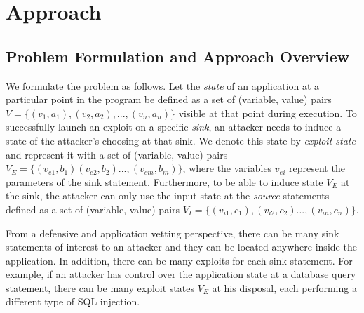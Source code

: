 \section{Approach}
\label{sec:approach}

\subsection{Problem Formulation and Approach Overview} We formulate the problem as follows. Let the \textit{state} of an application at a particular point in the program be defined as a set of (variable, value) pairs $V = \{(v_1, a_1), (v_2, a_2), ..., (v_n, a_n)\}$ visible at that point during execution. 
To successfully launch an exploit on a specific \textit{sink}, an attacker needs to induce a state of the attacker's choosing at that sink. We denote this state by \textit{exploit state} and represent it with a set of (variable, value) pairs $V_E = \{(v_{e1}, b_1) (v_{e2}, b_2) ..., (v_{em}, b_m)\}$, where the variables $v_{ei}$ represent the parameters of the sink statement. Furthermore, to be able to induce state $V_E$ at the sink, the attacker can only use the input state at the \textit{source} statements defined as a set of (variable, value) pairs $V_I = \{(v_{i1}, c_1), (v_{i2}, c_2) ..., (v_{in}, c_n)\}$. 

From a defensive and application vetting perspective, there can be many sink statements of interest to an attacker and they can be located anywhere inside the application. In addition, there can be many exploits for each sink statement. For example, if an attacker has control over the application state at a database query statement, there can be many exploit states $V_E$ at his disposal, each performing a different type of SQL injection. 


